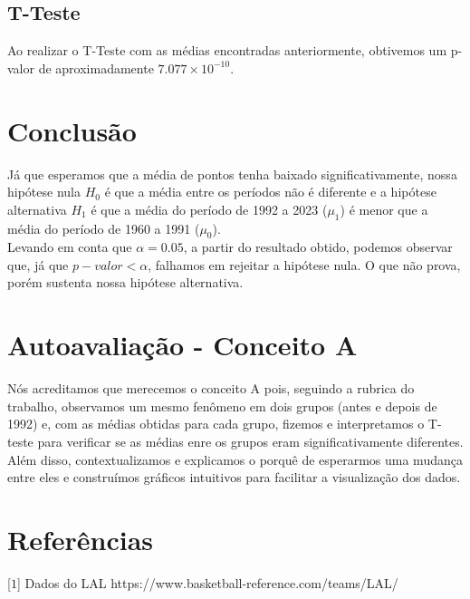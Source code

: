 \documentclass{article}
\begin{document}
    \subsection*{T-Teste}

    Ao realizar o T-Teste com as médias encontradas anteriormente, obtivemos um p-valor de aproximadamente
    $7.077 \times 10^{-10}$.


    \section*{Conclusão}

    Já que esperamos que a média de pontos tenha baixado significativamente, nossa hipótese nula $H_0$
    é que a média entre os períodos não é diferente e a hipótese alternativa $H_1$ é que a média do período
    de 1992 a 2023 ($\mu_1$) é menor que a média do período de 1960 a 1991 ($\mu_0$).\\
    
    Levando em conta que $\alpha = 0.05$, a partir do resultado obtido, podemos observar que, já que 
    $p-valor < \alpha$, falhamos em rejeitar a hipótese nula. O que não prova, porém sustenta nossa 
    hipótese alternativa.\\


    \section*{Autoavaliação - Conceito A}

    Nós acreditamos que merecemos o conceito A pois, seguindo a rubrica do trabalho, observamos um mesmo
    fenômeno em dois grupos (antes e depois de 1992) e, com as médias obtidas para cada grupo, fizemos
    e interpretamos o T-teste para verificar se as médias enre os grupos eram significativamente diferentes.
    Além disso, contextualizamos e explicamos o porquê de esperarmos uma mudança entre eles e construímos
    gráficos intuitivos para facilitar a visualização dos dados.\\


    \section*{Referências}

    [$1$] Dados do LAL  https://www.basketball-reference.com/teams/LAL/
\end{document}
